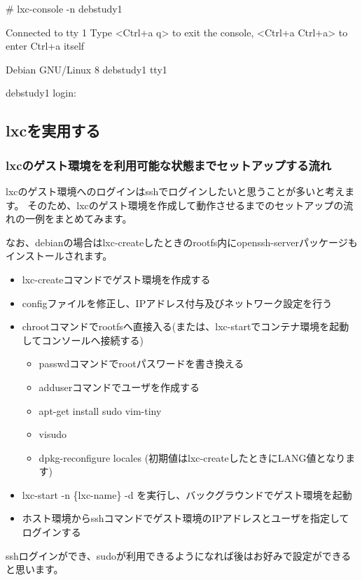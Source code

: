 \documentclass[mingoth,a4paper]{jsarticle}
\begin{document}
\begin{commandline}
  # lxc-console -n debstudy1

  Connected to tty 1
  Type <Ctrl+a q> to exit the console, <Ctrl+a Ctrl+a> to enter Ctrl+a itself

  Debian GNU/Linux 8 debstudy1 tty1

  debstudy1 login:
\end{commandline}


\subsection{lxcを実用する}
\subsubsection{lxcのゲスト環境をを利用可能な状態までセットアップする流れ}

lxcのゲスト環境へのログインはsshでログインしたいと思うことが多いと考えます。
そのため、lxcのゲスト環境を作成して動作させるまでのセットアップの流れの一例をまとめてみます。

なお、debianの場合はlxc-createしたときのrootfs内にopenssh-serverパッケージもインストールされます。

\begin{itemize}
\item lxc-createコマンドでゲスト環境を作成する
\item configファイルを修正し、IPアドレス付与及びネットワーク設定を行う
\item chrootコマンドでrootfsへ直接入る(または、lxc-startでコンテナ環境を起動してコンソールへ接続する)
  \begin{itemize}
  \item passwdコマンドでrootパスワードを書き換える
  \item adduserコマンドでユーザを作成する
  \item apt-get install sudo vim-tiny
  \item visudo
  \item dpkg-reconfigure locales  (初期値はlxc-createしたときにLANG値となります)
  \end{itemize}
\item lxc-start -n \{lxc-name\} -d を実行し、バックグラウンドでゲスト環境を起動
\item ホスト環境からsshコマンドでゲスト環境のIPアドレスとユーザを指定してログインする
\end{itemize}

sshログインができ、sudoが利用できるようになれば後はお好みで設定ができると思います。
\end{document}
